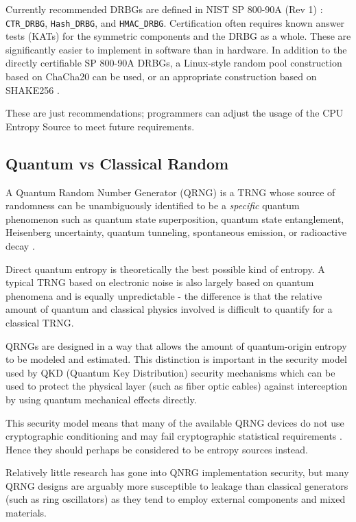     Currently recommended DRBGs are defined in NIST SP 800-90A (Rev 1)
    \cite{BaKe15}: \verb|CTR_DRBG|, \verb|Hash_DRBG|, and \verb|HMAC_DRBG|.
    Certification often requires known answer tests (KATs) for the symmetric
    components and the DRBG as a whole. These are significantly easier to
    implement in software than in hardware. In addition to the directly
    certifiable SP 800-90A DRBGs, a Linux-style random pool construction
    based on ChaCha20 \cite{Mu20} can be used, or an appropriate
    construction based on SHAKE256 \cite{NI15}.

    These are just recommendations; programmers can adjust the usage of the
    CPU Entropy Source to meet future requirements.


\subsection{Quantum vs Classical Random}
\label{sec:quantum}

    A Quantum Random Number Generator (QRNG) is a TRNG whose source of
    randomness can be unambiguously identified to be a \emph{specific}
    quantum phenomenon such as quantum state superposition, quantum state
    entanglement, Heisenberg uncertainty, quantum tunneling, spontaneous
    emission, or radioactive decay \cite{IT19}.


    Direct quantum entropy is theoretically the best possible kind of
    entropy. A typical TRNG based on electronic noise is also largely
    based on quantum phenomena and is equally unpredictable - the difference
    is that the relative amount of quantum and classical physics involved is
    difficult to quantify for a classical TRNG.

    QRNGs are designed in a way that allows the amount of quantum-origin
    entropy to be modeled and estimated. This distinction is important in
    the security model used by QKD (Quantum Key Distribution) security
    mechanisms which can be used to protect the physical layer (such as
    fiber optic cables) against interception by using quantum mechanical
    effects directly.

    This security model means that many of the available
    QRNG devices do not use cryptographic conditioning and may fail
    cryptographic statistical requirements \cite{HuHe20}. Hence they should
    perhaps be considered to be entropy sources instead.

    Relatively little research has gone into QNRG implementation security,
    but many QRNG designs are arguably more susceptible to leakage than
    classical generators (such as ring oscillators) as they tend to employ
    external components and mixed materials.

